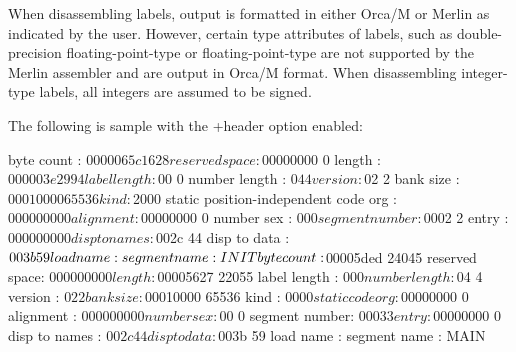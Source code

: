 \description
When disassembling labels, output is formatted in either Orca/M or Merlin as
indicated by the user. However, certain type attributes of labels, such as
double-precision floating-point-type or floating-point-type are not
supported by the Merlin assembler and are output in Orca/M format. When
disassembling integer-type labels, all integers are assumed to be signed.

\vfill\eject

\description
The following is sample with the +header option enabled:

\bigskip
\beginsample
byte count    : $0000065c                               1628
reserved space: $00000000                                  0
length        : $000003e2                                994
label length  : $00                                        0
number length : $04                                        4
version       : $02                                        2
bank size     : $00010000                              65536
kind          : $2000            static position-independent
                                                        code
org           : $00000000                                  0
alignment     : $00000000                                  0
number sex    : $00                                        0
segment number: $0002                                      2
entry         : $00000000                                  0
disp to names : $002c                                     44
disp to data  : $003b                                     59
load name     : 
segment name  : INIT
\medskip
byte count    : $00005ded                              24045
reserved space: $00000000                                  0
length        : $00005627                              22055
label length  : $00                                        0
number length : $04                                        4
version       : $02                                        2
bank size     : $00010000                              65536
kind          : $0000                            static code
org           : $00000000                                  0
alignment     : $00000000                                  0
number sex    : $00                                        0
segment number: $0003                                      3
entry         : $00000000                                  0
disp to names : $002c                                     44
disp to data  : $003b                                     59
load name     : 
segment name  : MAIN
\endsample
\medskip

